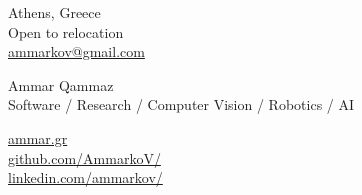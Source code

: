 \documentclass[a4,8pt]{article}
\begin{document}
 
\begin{center}
    \begin{minipage}[b]{0.24\textwidth}
            \large Athens, Greece \\
            \large Open to relocation \\
            \large \href{mailto:ammarkov@gmail.com}{ammarkov@gmail.com} 
    \end{minipage}%
    \begin{minipage}[b]{0.5\textwidth}
            \centering
            {\HUGE Ammar Qammaz} \\ %
            \vspace{0.1cm}
            {\color{UICOLOR} {Software / Research / Computer Vision / Robotics / AI }} \\
    \end{minipage}%
    \begin{minipage}[b]{0.24\textwidth}
            \flushright \large  %
            {\href{http://ammar.gr}{ammar.gr} } \\
            {\href{https://github.com/AmmarkoV/}{github.com/AmmarkoV/} } \\
            {\href{https://www.linkedin.com/in/ammarkov}{linkedin.com/ammarkov/} }
    \end{minipage}   
    
\vspace{-0.15cm} 
{\color{UICOLOR} \hrulefill}
\end{center}
\vspace{-0.2cm}
\end{document}
